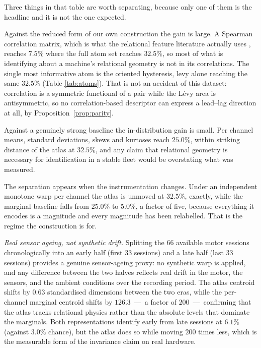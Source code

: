 \documentclass[11pt]{article}
\newcommand{\levy}{\mathrm{levy}}
\begin{document}
Three things in that table are worth separating, because only one of them is
the headline and it is not the one expected.

Against the reduced form of our own construction the gain is large. A Spearman
correlation matrix, which is what the relational feature literature actually
uses \cite{finn2015,li2022graph}, reaches $7.5\%$ where the full atom set
reaches $32.5\%$, so most of what is identifying about a machine's relational
geometry is not in its correlations. The single most informative atom is the
oriented hysteresis, $\levy$ alone reaching the same $32.5\%$ (Table
\ref{tab:atoms}). That is not an accident of this dataset: correlation is a
symmetric functional of a pair while the L\'evy area is antisymmetric, so no
correlation-based descriptor can express a lead--lag direction at all, by
Proposition~\ref{prop:parity}.

Against a genuinely strong baseline the in-distribution gain is small. Per
channel means, standard deviations, skews and kurtoses reach $25.0\%$, within
striking distance of the atlas at $32.5\%$, and any claim that relational
geometry is necessary for identification in a stable fleet would be
overstating what was measured.

The separation appears when the instrumentation changes. Under an independent
monotone warp per channel the atlas is unmoved at $32.5\%$, exactly, while the
marginal baseline falls from $25.0\%$ to $5.0\%$, a factor of five, because
everything it encodes is a magnitude and every magnitude has been relabelled.
That is the regime the construction is for.

\emph{Real sensor ageing, not synthetic drift.} Splitting the 66 available
motor sessions chronologically into an early half (first 33 sessions) and a
late half (last 33 sessions) provides a genuine sensor-ageing proxy: no
synthetic warp is applied, and any difference between the two halves reflects
real drift in the motor, the sensors, and the ambient conditions over the
recording period. The atlas centroid shifts by $0.63$ standardised dimensions
between the two eras, while the per-channel marginal centroid shifts by
$126.3$\ ---\ a factor of $200$\ ---\ confirming that the atlas tracks
relational physics rather than the absolute levels that dominate the
marginals. Both representations identify early from late sessions at
$6.1\%$ (against $3.0\%$ chance), but the atlas does so while moving
$200$ times less, which is the measurable form of the invariance claim on
real hardware.
\end{document}
